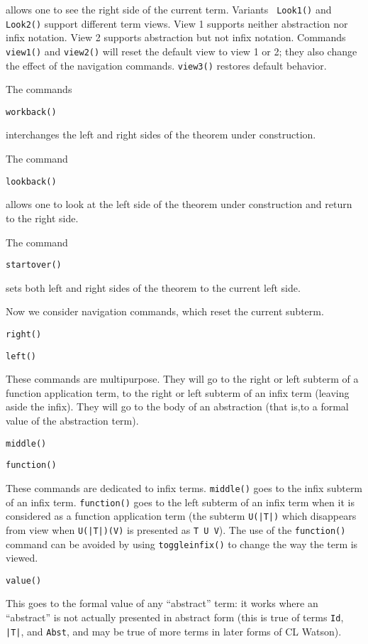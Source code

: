 \documentclass[12pt]{article}
\begin{document}
allows one to see the right side of the current term.  Variants {\tt
Look1()} and {\tt Look2()} support different term views.  View 1
supports neither abstraction nor infix notation.  View 2 supports
abstraction but not infix notation.  Commands {\tt view1()} and {\tt view2()}
will reset the default view to view 1 or 2; they also change the effect
of the navigation commands.  {\tt view3()} restores default behavior.

The commands

{\tt workback()}

interchanges the left and right sides of the theorem under construction.

The command

{\tt lookback()} 

allows one to look at the left side of the theorem
under construction and return to the right side.

The command

{\tt startover()}

sets both left and right sides of the theorem to the current left side.

Now we consider navigation commands, which reset the current subterm.

{\tt right()}

{\tt left()}

These commands are multipurpose.  They will go to the right or left
subterm of a function application term, to the right or left subterm
of an infix term (leaving aside the infix).  They will go to the body
of an abstraction (that is,to a formal value of the abstraction term).

{\tt middle()}

{\tt function()}

These commands are dedicated to infix terms.  {\tt middle()} goes to
the infix subterm of an infix term.  {\tt function()} goes to the left
subterm of an infix term when it is considered as a function
application term (the subterm {\tt U(|T|)} which disappears from view
when {\tt U(|T|)(V)} is presented as {\tt T U V}).  The use of the
{\tt function()} command can be avoided by using {\tt toggleinfix()}
to change the way the term is viewed.

{\tt value()}

This goes to the formal value of any ``abstract'' term:  it works where
an ``abstract'' is not actually presented in abstract form (this is true
of terms {\tt Id}, {\tt |T|}, and {\tt Abst}, and may be true of more terms
in later forms of CL Watson).  
\end{document}
